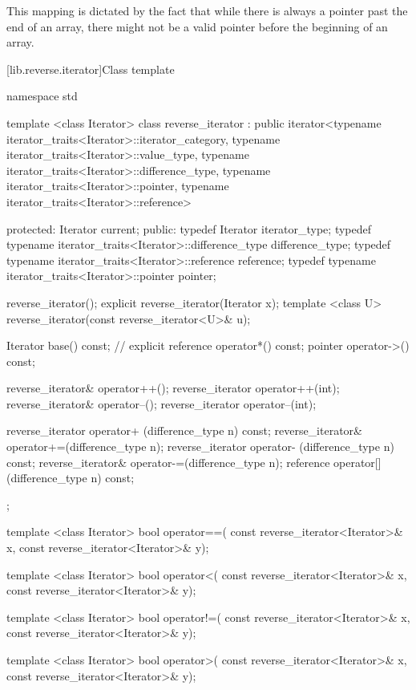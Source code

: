 \pnum
This mapping is dictated by the fact that while there is always a pointer
past the end of an array, there might not be a valid pointer before the
beginning of an array.

[lib.reverse.iterator]{Class template }

%
\begin{codeblock}
namespace std {
  template <class Iterator>
  class reverse_iterator : public
        iterator<typename iterator_traits<Iterator>::iterator_category,
                 typename iterator_traits<Iterator>::value_type,
                 typename iterator_traits<Iterator>::difference_type,
                 typename iterator_traits<Iterator>::pointer,
                 typename iterator_traits<Iterator>::reference> {
  protected:
    Iterator current;
  public:
    typedef Iterator
        iterator_type;
    typedef typename iterator_traits<Iterator>::difference_type
        difference_type;
    typedef typename iterator_traits<Iterator>::reference
        reference;
    typedef typename iterator_traits<Iterator>::pointer
        pointer;

    reverse_iterator();
    explicit reverse_iterator(Iterator x);
    template <class U> reverse_iterator(const reverse_iterator<U>& u);

    Iterator base() const;      // explicit
    reference operator*() const;
    pointer   operator->() const;

    reverse_iterator& operator++();
    reverse_iterator  operator++(int);
    reverse_iterator& operator--();
    reverse_iterator  operator--(int);

    reverse_iterator  operator+ (difference_type n) const;
    reverse_iterator& operator+=(difference_type n);
    reverse_iterator  operator- (difference_type n) const;
    reverse_iterator& operator-=(difference_type n);
    reference operator[](difference_type n) const;
  };

  template <class Iterator>
    bool operator==(
      const reverse_iterator<Iterator>& x,
      const reverse_iterator<Iterator>& y);

  template <class Iterator>
    bool operator<(
      const reverse_iterator<Iterator>& x,
      const reverse_iterator<Iterator>& y);

  template <class Iterator>
    bool operator!=(
      const reverse_iterator<Iterator>& x,
      const reverse_iterator<Iterator>& y);

  template <class Iterator>
    bool operator>(
      const reverse_iterator<Iterator>& x,
      const reverse_iterator<Iterator>& y);

}
\end{codeblock}
